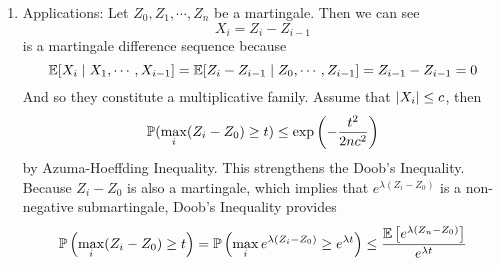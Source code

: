 \begin{enumerate}[label=\arabic{*}.]
\begin{proof}
	    \begin{equation*}
	    	e^{\lambda x} \leq a x + b,\quad \forall~x \in [-c,c]
	    \end{equation*}
	    by setting
	    \begin{equation*}
	    	a = \frac{e^{\lambda c} - e^{-\lambda c}}{2c},\quad b = \frac{e^{\lambda c} + e^{-\lambda c}}{2}
	    \end{equation*}
	    For $\lambda > 0$, 
	    \begin{equation*}
	    	\begin{aligned}
	    		\E \bj{e^{\lambda \sum_{i=1}^n X_i}} &= \E \bj{\Pi_{i=1}^n e^{\lambda X_i}} \\
	    		&\leq \E \bj{\Pi_{i=1}^n(a_iX_i + b_i) }= \E \bj{\Pi_{i=1}^n b_i} \\
	    		&= \Pi_{i=1}^n\bc{ \frac{e^{\lambda c_i} + e^{-\lambda c_i}}{2}} \\
	    		&= \Pi_{i=1}^n \bc{1 + \frac{\lambda^2 c_i^2}{2!} + \frac{\lambda^4 c_i^4}{4!} + \frac{\lambda^6 c_i^6}{6!}\cdots}\\
	    		&\leq \Pi_{i=1}^n \bc{1 + \frac{\lambda^2 c_i^2}{2} + \frac{\lambda^4 c_i^4 / 4}{2!} + \frac{\lambda^6 c_i^6 /8}{3!}\cdots}\\
	    		&= \Pi_{i=1}^n \exp\bc{\frac{\lambda^2 c_i^2}{2}}
	    	\end{aligned}
	    \end{equation*}
	    Therefore,
	    \begin{equation*}
	    	\psi_{\sum X_i} \leq \frac{\lambda^2}{2}\sum_{i=1}^nc_i^2 \qedhere
	    \end{equation*}
	\end{proof}

	\item Applications: Let $Z_0,Z_1,\cdots,Z_n$ be a martingale. Then we can see
	\begin{equation*}
		X_i = Z_i - Z_{i-1}
	\end{equation*}
	is a martingale difference sequence because
	\begin{equation*}
		\mathbb{E}[X_i \mid X_1,\cdots,X_{i-1}] = \mathbb{E}[Z_i - Z_{i-1} \mid Z_0,\cdots,Z_{i-1}] = Z_{i-1} - Z_{i-1} = 0
	\end{equation*}
	And so they constitute a multiplicative family. Assume that $\left\lvert X_i\right\lvert \leq c$, then
	\begin{equation*}
		\mathbb{P}(\max_i(Z_i-Z_0) \geq t) \leq \exp\left(-\frac{t^2}{2nc^2}\right)
	\end{equation*}
	by Azuma-Hoeffding Inequality. This strengthens the Doob's Inequality. Because $Z_i - Z_0$ is also a martingale, which implies that $e^{\lambda (Z_i - Z_0)}$ is a non-negative submartingale, Doob's Inequality provides
	\begin{equation*}
	    \mathbb{P}\left(\max_i (Z_i - Z_0) \geq t\right) = \mathbb{P}\left(\max_i e^{\lambda (Z_i - Z_0)} \geq e^{\lambda t}\right) \leq \frac{\mathbb{E} \left[e^{\lambda (Z_n-Z_0)}\right]}{e^{\lambda t}}
	\end{equation*}


\end{enumerate}

